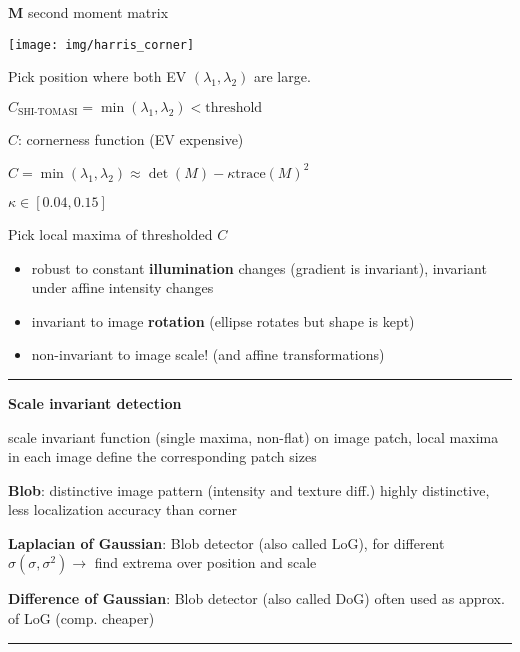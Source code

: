 \documentclass[fontsize=6pt]{scrartcl}
\newcommand{\mat}[1]{\mathbf{#1}}
\begin{document}
\begin{multicols*}{4}
$\mat M$ second moment matrix

\begin{minipage}{0.35\linewidth}
	\texttt{[image: img/harris\_corner]}
\end{minipage}
\begin{minipage}{0.65\linewidth}
	Pick position where both EV $(\lambda_1, \lambda_2)$ are large.

	$C_{\text{SHI-TOMASI}} =\min(\lambda_1, \lambda_2) < \text{threshold}$

	$C$: cornerness  function (EV expensive)

	$ C = \min(\lambda_1, \lambda_2) \approx \det(M) - \kappa \text{trace}(M)^2$

	$ \kappa \in [0.04, 0.15]$

	Pick local maxima of thresholded $C$
\end{minipage}

\begin{itemize}
\item robust to constant \textbf{illumination} changes (gradient is invariant), invariant under affine intensity changes
\item invariant to image \textbf{rotation} (ellipse rotates but shape is kept)
\item non-invariant to image scale! (and affine transformations)
\end{itemize}

\hrule
\vspace{4pt}

\textbf{Scale invariant detection}

scale invariant function (single maxima, non-flat) on image patch, local maxima in each image define the corresponding patch sizes

\textbf{Blob}: distinctive image pattern (intensity and texture diff.) highly distinctive, less localization accuracy than corner

\textbf{Laplacian of Gaussian}:	Blob detector (also called LoG),	for different $\sigma (\sigma, \sigma^2) \rightarrow$ find extrema over position and scale

\textbf{Difference of Gaussian}: Blob detector (also called DoG) often used as approx. of LoG (comp. cheaper)

\hrule
\vspace{4pt}


\end{multicols*}
\end{document}
